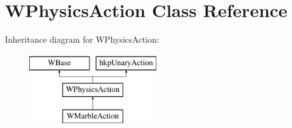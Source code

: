 \hypertarget{class_w_physics_action}{}\section{W\+Physics\+Action Class Reference}
\label{class_w_physics_action}
Inheritance diagram for W\+Physics\+Action\+:\begin{figure}[H]
\begin{center}
\leavevmode
\includegraphics[height=3.000000cm]{class_w_physics_action}
\end{center}
\end{figure}

